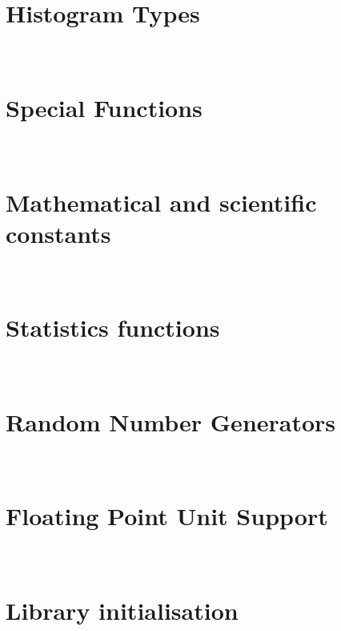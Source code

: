 \documentclass{manual}
\makeatletter
\let\py@OldOldChapter=\chapter
\renewcommand{\chapter}{\py@reset%
                        \py@OldOldChapter}
\makeatother
\begin{document}
\chapter[\protect\module{pygsl.histogram} --- Histogram Types]
{\protect{} \\ Histogram Types}
\label{cha:histogram-module}


\chapter[\protect\module{pygsl.sf} --- Special Functions]
{\protect{} \\ Special Functions}
\label{cha:sf-module}


\chapter[\protect\module{pygsl.const} --- Mathematical and scientific
constants]{\protect{} \\ Mathematical and scientific
constants} 
\label{cha:const-module}


\chapter[\protect\module{pygsl.statistics} --- Statistics
functions]{\protect{} \\ Statistics functions}
\label{cha:statistics-module}


\chapter[\protect\module{pygsl.rng} --- Random Number Generators]
{\protect{} \\ Random Number Generators}
\label{cha:rng-module}


\chapter[\protect\module{pygsl.ieee} --- Floating Point Unit Support]
{\protect{} \\ Floating Point Unit Support}
\label{cha:ieee-module}


\chapter[\protect\module{pygsl.init} --- Library initialisation]
{\protect{} \\ Library initialisation}
\label{cha:library-initialisation}

\end{document}
